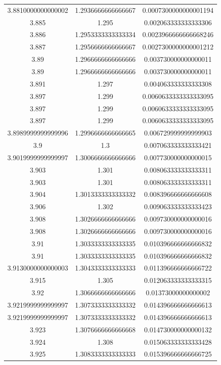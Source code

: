 \documentclass[a4paper,12pt]{article}
\begin{document}
\begin{justify}
\begin{scriptsize}
\begin{longtable}{|c|c|c|}
3.8810000000000002 & 1.2936666666666667 & 0.0007300000000001194 \\
3.885 & 1.295 & 0.002063333333333306 \\
3.886 & 1.2953333333333334 & 0.0023966666666668246 \\
3.887 & 1.2956666666666667 & 0.0027300000000001212 \\
3.89 & 1.2966666666666666 & 0.003730000000000011 \\
3.89 & 1.2966666666666666 & 0.003730000000000011 \\
3.891 & 1.297 & 0.004063333333333308 \\
3.897 & 1.299 & 0.0060633333333333095 \\
3.897 & 1.299 & 0.0060633333333333095 \\
3.897 & 1.299 & 0.0060633333333333095 \\
3.8989999999999996 & 1.2996666666666665 & 0.006729999999999903 \\
3.9 & 1.3 & 0.007063333333333421 \\
3.9019999999999997 & 1.3006666666666666 & 0.007730000000000015 \\
3.903 & 1.301 & 0.008063333333333311 \\
3.903 & 1.301 & 0.008063333333333311 \\
3.904 & 1.3013333333333332 & 0.008396666666666608 \\
3.906 & 1.302 & 0.009063333333333423 \\
3.908 & 1.3026666666666666 & 0.009730000000000016 \\
3.908 & 1.3026666666666666 & 0.009730000000000016 \\
3.91 & 1.3033333333333335 & 0.010396666666666832 \\
3.91 & 1.3033333333333335 & 0.010396666666666832 \\
3.9130000000000003 & 1.3043333333333333 & 0.011396666666666722 \\
3.915 & 1.305 & 0.012063333333333315 \\
3.92 & 1.3066666666666666 & 0.01373000000000002 \\
3.9219999999999997 & 1.3073333333333332 & 0.014396666666666613 \\
3.9219999999999997 & 1.3073333333333332 & 0.014396666666666613 \\
3.923 & 1.3076666666666668 & 0.014730000000000132 \\
3.924 & 1.308 & 0.015063333333333428 \\
3.925 & 1.3083333333333333 & 0.015396666666666725 \\

\end{longtable}
\end{scriptsize}
\end{justify}
\end{document}
